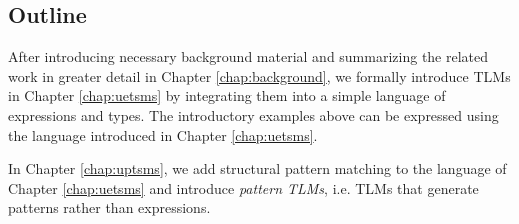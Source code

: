 

\subsection{Outline}

After introducing necessary background material and summarizing the related work in greater detail in Chapter \ref{chap:background}, we formally introduce TLMs in Chapter \ref{chap:uetsms} by integrating them into a simple language of expressions and types. The introductory examples above can be expressed using the language introduced in Chapter \ref{chap:uetsms}. 


In Chapter \ref{chap:uptsms}, we add structural pattern matching to the language of Chapter \ref{chap:uetsms} and introduce \emph{pattern TLMs}, i.e. TLMs that generate patterns rather than expressions.


